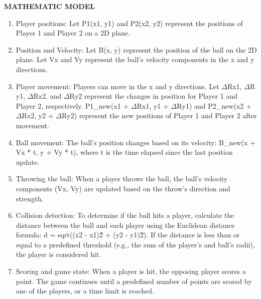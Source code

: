 \documentclass[12pt]{report}
\begin{document}
\large\textbf{MATHEMATIC MODEL}
\normalsize
\justifying
\setlength{\parindent}{4em}
\setlength{\parskip}{0.5em}
\renewcommand{\baselinestretch}{1.5}
\vspace{0.1cm}
\begin{enumerate}
\item Player positions:
Let P1(x1, y1) and P2(x2, y2) represent the positions of Player 1 and Player 2 on a 2D plane.

\item Position and Velocity:
Let B(x, y) represent the position of the ball on the 2D plane.
Let Vx and Vy represent the ball's velocity components in the x and y directions.

\item Player movement:
Players can move in the x and y directions. Let $\Delta\mathrm{R}$x1, $\Delta\mathrm{R}$y1, $\Delta\mathrm{R}$x2, and $\Delta\mathrm{R}$y2 represent the changes in position for Player 1 and Player 2, respectively.
P1\_new(x1 + $\Delta\mathrm{R}$x1, y1 + $\Delta\mathrm{R}$y1) and P2\_new(x2 + $\Delta\mathrm{R}$x2, y2 + $\Delta\mathrm{R}$y2) represent the new positions of Player 1 and Player 2 after movement.

\item Ball movement:
The ball's position changes based on its velocity: B\_new(x + Vx * t, y + Vy * t), where t is the time elapsed since the last position update.

\item Throwing the ball:
When a player throws the ball, the ball's velocity components (Vx, Vy) are updated based on the throw's direction and strength.

\item Collision detection:
To determine if the ball hits a player, calculate the distance between the ball and each player using the Euclidean distance formula: d = sqrt((x2 - x1)\^2 + (y2 - y1)\^2).
If the distance is less than or equal to a predefined threshold (e.g., the sum of the player's and ball's radii), the player is considered hit.

\item Scoring and game state:
When a player is hit, the opposing player scores a point.
The game continues until a predefined number of points are scored by one of the players, or a time limit is reached.


\end{enumerate}


\clearpage

\vspace{4cm}
\raggedright
\centering
\end{document}
